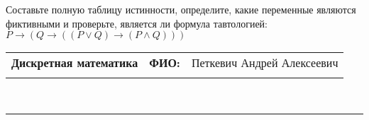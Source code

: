 \documentclass[10pt]{exam}
\newcommand{\class}{Дискретная математика}
\newcommand{\examdate}{}
\begin{document}
\begin{questions}
\begin{enumerate}[a)]
\end{enumerate}\question Составьте полную таблицу истинности, определите, какие переменные являются фиктивными и проверьте, является ли формула тавтологией:
$ P \rightarrow (Q \rightarrow ((P \lor Q) \rightarrow (P \land Q)))$

\end{questions}
\newpage
\begin{flushright}
\begin{tabular}{p{2.8in} r l}
\textbf{\class} & \textbf{ФИО:} &Петкевич Андрей Алексеевич
\\

\textbf{\examdate} &&\\
\end{tabular}\\
\end{flushright}
\rule[1ex]{\textwidth}{.1pt}
\end{document}
